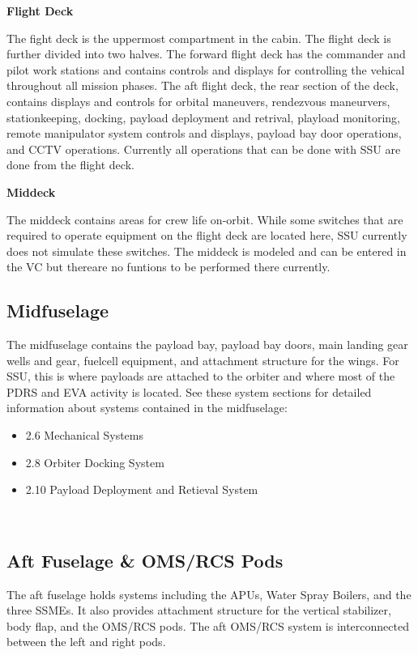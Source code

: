 \documentclass[13pt, letter,final]{article}
\begin{document}
\begin{multicols}{2}

\newpage
\begin{center}
\textbf{Flight Deck}
\end{center}
The fight deck is the uppermost compartment in the cabin.  The flight deck is further divided into two halves. The forward flight deck has the commander and pilot work stations and contains controls and displays for controlling the vehical throughout all mission phases. The aft flight deck, the rear section of the deck, contains displays and controls for orbital maneuvers, rendezvous maneurvers, stationkeeping, docking, payload deployment and retrival, playload monitoring, remote manipulator system controls and displays, payload bay door operations, and CCTV operations.  Currently all operations that can be done with SSU are done from the flight deck.

\begin{center}
\textbf{Middeck}
\end{center}
The middeck contains areas for crew life on-orbit.  While some switches that are required to operate equipment on the flight deck are located here, SSU currently does not simulate these switches.  The middeck is modeled and can be entered in the VC but thereare no funtions to be performed there currently.
\\

\begin{center}
 \subsection*{Midfuselage}
\end{center}
The midfuselage contains the payload bay, payload bay doors, main landing gear wells and gear, fuelcell equipment, and attachment structure for the wings. For SSU, this is where payloads are attached to the orbiter and where most of the PDRS and EVA activity is located. See these system sections for detailed information about systems contained in the midfuselage: 
\begin{itemize}
\item 2.6 Mechanical Systems
\item 2.8 Orbiter Docking System
\item 2.10 Payload Deployment and Retieval System
\end{itemize}
\\
\begin{center}
 \subsection*{Aft Fuselage \& OMS/RCS Pods}
\end{center}
The aft fuselage holds systems including the APUs, Water Spray Boilers, and the three SSMEs. It also provides attachment structure for the vertical stabilizer, body flap, and the OMS/RCS pods.  The aft OMS/RCS system is interconnected between the left and right pods.
\\

\end{multicols}
\end{document}
